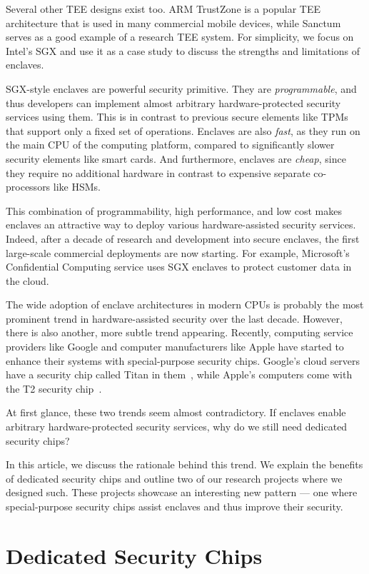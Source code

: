 \documentclass[letterpaper,twocolumn,10pt]{article}
\begin{document}
Several other TEE designs exist too. ARM TrustZone is a popular TEE architecture that is used in many commercial mobile devices, while Sanctum~\cite{sanctum} serves as a good example of a research TEE system. For simplicity, we focus on Intel's SGX and use it as a case study to discuss the strengths and limitations of enclaves.

SGX-style enclaves are powerful security primitive. They are \emph{programmable}, and thus developers can implement almost arbitrary hardware-protected security services using them. This is in contrast to previous secure elements like TPMs that support only a fixed set of operations. Enclaves are also \emph{fast}, as they run on the main CPU of the computing platform, compared to significantly slower security elements like smart cards. And furthermore, enclaves are \emph{cheap}, since they require no additional hardware in contrast to expensive separate co-processors like HSMs. 

This combination of programmability, high performance, and low cost makes enclaves an attractive way to deploy various hardware-assisted security services. Indeed, after a decade of research and development into secure enclaves, the first large-scale commercial deployments are now starting. For example, Microsoft's Confidential Computing service uses SGX enclaves to protect customer data in the cloud.

The wide adoption of enclave architectures in modern CPUs is probably the most prominent trend in hardware-assisted security over the last decade. However, there is also another, more subtle trend appearing. Recently, computing service providers like Google and computer manufacturers like Apple have started to enhance their systems with special-purpose security chips. Google's cloud servers have a security chip called Titan in them~\cite{titan}, while Apple's computers come with the T2 security chip~\cite{t2}. 

At first glance, these two trends seem almost contradictory. If enclaves enable arbitrary hardware-protected security services, why do we still need dedicated security chips? 

In this article, we discuss the rationale behind this trend. We explain the benefits of dedicated security chips and outline two of our research projects where we designed such. These projects showcase an interesting new pattern --- one where special-purpose security chips assist enclaves and thus improve their security.

\section*{Dedicated Security Chips}
\end{document}
